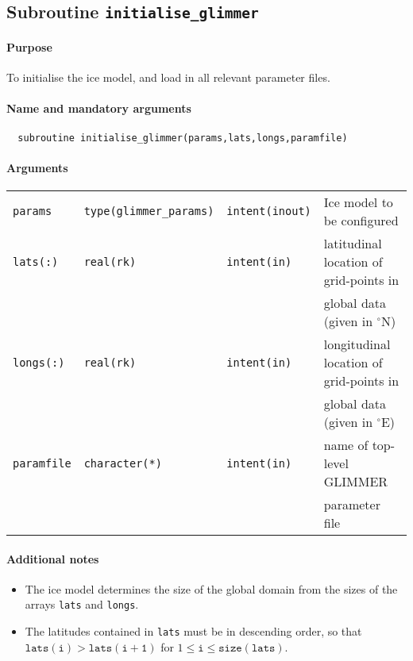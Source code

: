 \documentclass[11pt]{article}
\begin{document}
\subsection{Subroutine \texttt{initialise\_glimmer}}
%
\paragraph{Purpose} To initialise the ice model, and load in all relevant parameter files.
%
\paragraph{Name and mandatory arguments}
%
\begin{verbatim}
  subroutine initialise_glimmer(params,lats,longs,paramfile)
\end{verbatim}
%
\paragraph{Arguments}
%
\begin{center}
\begin{tabular}{llll}
\texttt{params}    & \texttt{type(glimmer\_params)} & \texttt{intent(inout)} &
Ice model to be configured \\
\texttt{lats(:)}   & \texttt{real(rk)} & \texttt{intent(in)} & latitudinal location of grid-points in \\
 & & & global data (given in $^{\circ}\mathrm{N}$)\\
\texttt{longs(:)}  & \texttt{real(rk)} & \texttt{intent(in)} & longitudinal location of grid-points in \\
 & & & global data (given in $^{\circ}\mathrm{E}$)\\
\texttt{paramfile} & \texttt{character(*)} & \texttt{intent(in)} & name of
top-level GLIMMER \\
 & & & parameter file \\
\end{tabular}
\end{center}
%
\paragraph{Additional notes}
%
\begin{itemize}
\item The ice model determines the size of the global domain from the sizes of
  the arrays \texttt{lats} and \texttt{longs}.
\item The latitudes contained in \texttt{lats} must be in descending order, so
  that $\mathtt{lats(i)}>\mathtt{lats(i+1)}$ for $1\leq \mathtt{i} \leq
  \mathtt{size(lats)}$.
\end{itemize}
%
\end{document}
